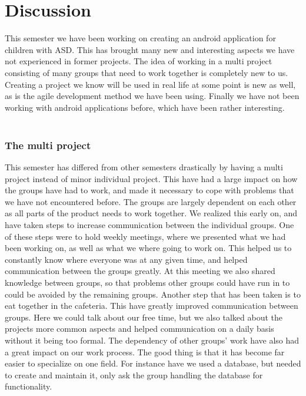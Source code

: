 \chapter{Discussion}
This semester we have been working on creating an android application for children with ASD. 
This has brought many new and interesting aspects we have not experienced in former projects. 
The idea of working in a multi project consisting of many groups that need to work together is completely new to us. 
Creating a project we know will be used in real life at some point is new as well, as is the agile development method we have been using. Finally we have not been working with android applications before, which have been rather interesting.\\ 
\\
\subsection*{The multi project}
This semester has differed from other semesters drastically by having a multi project instead of minor individual project. 
This have had a large impact on how the groups have had to work, and made it necessary to cope with problems that we have not encountered before.\newline
The groups are largely dependent on each other as all parts of the product needs to work together. 
We realized this early on, and have taken steps to increase communication between the individual groups. 
One of these steps were to hold weekly meetings, where we presented what we had been working on, as well as what we where going to work on.\newline 
This helped us to constantly know where everyone was at any given time, and helped communication between the groups greatly. 
At this meeting we also shared knowledge between groups, so that problems other groups could have run in to could be avoided by the remaining groups.\newline
Another step that has been taken is to eat together in the cafeteria. This have greatly improved communication between groups. 
Here we could talk about our free time, but we also talked about the projects more common aspects and helped communication on a daily basis without it being too formal.\newline
The dependency of other groups' work have also had a great impact on our work process. 
The good thing is that it has become far easier to specialize on one field. 
For instance have we used a database, but needed to create and maintain it, only ask the group handling the database for functionality. 
